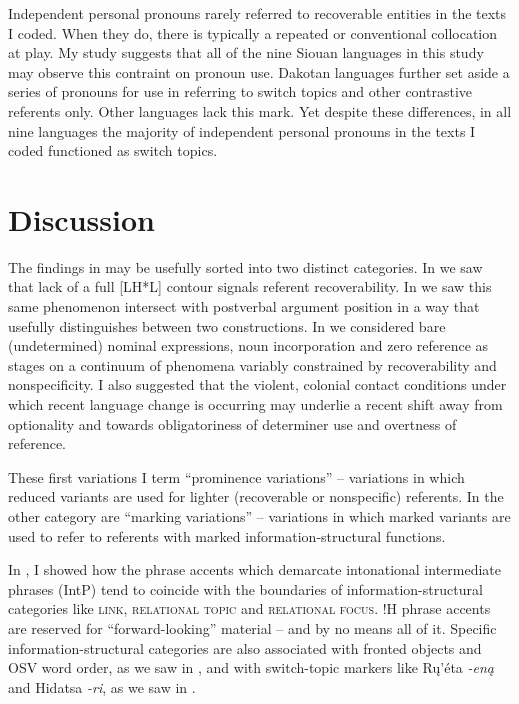 \documentclass[output=paper]{LSP/langsci}
\begin{document}
	Independent personal pronouns rarely referred to recoverable entities in the texts I coded. When they do, there is typically a repeated or conventional collocation at play. My study suggests that all of the nine Siouan languages in this study may observe this contraint on pronoun use. Dakotan languages further set aside a series of pronouns for use in referring to switch topics and other contrastive referents only. Other languages lack this mark. Yet despite these differences, in all nine languages the majority of independent personal pronouns in the texts I coded functioned as switch topics.

\section{Discussion}\label{discussion}

The findings in  may be usefully sorted into two distinct categories. In  we saw that lack of a full [LH*L] contour signals referent recoverability. In  we saw this same phenomenon intersect with postverbal argument position in a way that usefully distinguishes between two constructions. In  we considered bare (undetermined) nominal expressions, noun incorporation and zero reference as stages on a continuum of phenomena variably constrained by recoverability and nonspecificity. I also suggested that the violent, colonial contact conditions under which recent language change is occurring may underlie a recent shift away from optionality and towards obligatoriness of determiner use and overtness of reference. 

These first variations I term “prominence variations” -- variations in which reduced variants are used for lighter (recoverable or nonspecific) referents. In the other category are “marking variations” -- variations in which marked variants are used to refer to referents with marked information-structural functions. 

In , I showed how the phrase accents which demarcate intonational intermediate phrases (IntP) tend to coincide with the boundaries of information-structural categories like \textsc{link, relational topic} and \textsc{relational focus}. !H phrase accents are reserved for “forward-looking” material -- and by no means all of it. Specific information-structural categories are also associated with fronted objects and OSV word order, as we saw in , and with switch-topic markers like Rų’éta \emph{-eną} and Hidatsa \emph{-ri}, as we saw in .
\end{document}
